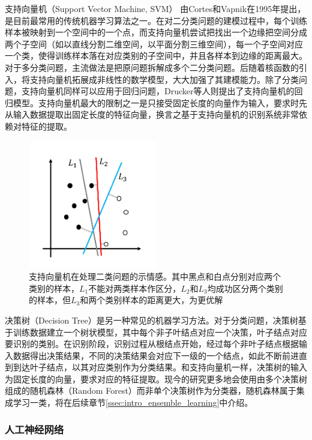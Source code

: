 支持向量机（Support Vector Machine, SVM）\cite{cortes1995support} 由Cortes和Vapnik在1995年提出，是目前最常用的传统机器学习算法之一。在对二分类问题的建模过程中，每个训练样本被映射到一个空间中的一个点，而支持向量机尝试把找出一个边缘把空间分成两个子空间（如以直线分割二维空间，以平面分割三维空间），每一个子空间对应一个类，使得训练样本落在对应类别的子空间中，并且各样本到边缘的距离最大。对于多分类问题，主流做法是把原问题拆解成多个二分类问题。后随着核函数的引入，将支持向量机拓展成非线性的数学模型，大大加强了其建模能力。除了分类问题，支持向量机同样可以应用于回归问题，Drucker等人\cite{drucker1997support}则提出了支持向量机的回归模型。支持向量机最大的限制之一是只接受固定长度的向量作为输入，要求时先从输入数据提取出固定长度的特征向量，换言之基于支持向量机的识别系统非常依赖对特征的提取。

\begin{figure}[H]
  \centering
  \includegraphics[width=0.5\textwidth]{img/svm.pdf}
  \caption{支持向量机在处理二类问题的示情感。其中黑点和白点分别对应两个类别的样本，$L_1$不能对两类样本作区分，$L_2$和$L_3$均成功区分两个类别的样本，但$L_3$和两个类别样本的距离更大，为更优解}
  \label{fig:svm}
\end{figure}

决策树（Decision Tree）是另一种常见的机器学习方法。对于分类问题，决策树基于训练数据建立一个树状模型，其中每个非子叶结点对应一个决策，叶子结点对应要识别的类别。在识别阶段，识别过程从根结点开始，经过每个非叶子结点根据输入数据得出决策结果，不同的决策结果会对应下一级的一个结点，如此不断前进直到到达叶子结点，以其对应类别作为分类结果。和支持向量机一样，决策树的输入为固定长度的向量，要求对应的特征提取。现今的研究更多地会使用由多个决策树组成的随机森林（Random Forest）而非单个决策树作为分类器，随机森林属于集成学习一类，将在后续章节\ref{ssec:intro_ensemble_learning}中介绍。

\subsubsection{人工神经网络}


